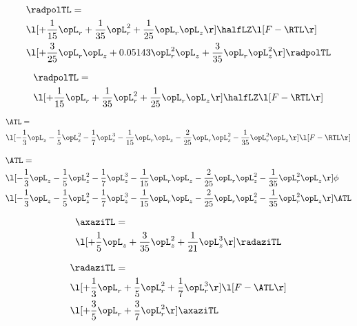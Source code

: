 \begin{alignat}{2} 
\label{eq:linradpolTL_2} 
& \radpolTL = \\ 
& \l[ + \frac{1}{15} \opL_r + \frac{1}{35} \opL_r^{2} + \frac{1}{25} \opL_r \opL_z  \r] \halfLZ \l[ F - \RTL \r] \nonumber \\ 
& \l[ + \frac{3}{25} \opL_r \opL_z +  0.05143 \opL_r^{2} \opL_z + \frac{3}{35} \opL_r \opL_z^{2}  \r] \radpolTL \nonumber \\ 
\end{alignat} 


\begin{alignat}{2} 
\label{eq:linradpolTL_3} 
& \radpolTL = \\ 
& \l[ + \frac{1}{15} \opL_r + \frac{1}{35} \opL_r^{2} + \frac{1}{25} \opL_r \opL_z  \r] \halfLZ \l[ F - \RTL \r] \nonumber \\ 
\end{alignat} 


\begin{alignat}{2} 
\label{eq:isoATL_1} 
& \ATL = \\ 
& \l[ - \frac{1}{3} \opL_z - \frac{1}{5} \opL_z^{2} - \frac{1}{7} \opL_z^{3} - \frac{1}{15} \opL_r \opL_z - \frac{2}{25} \opL_r \opL_z^{2} - \frac{1}{35} \opL_r^{2} \opL_z  \r] \l[ F - \RTL \r] \nonumber \\ 
\end{alignat} 


\begin{alignat}{2} 
\label{eq:isoATL_2} 
& \ATL = \\ 
& \l[ - \frac{1}{3} \opL_z - \frac{1}{5} \opL_z^{2} - \frac{1}{7} \opL_z^{3} - \frac{1}{15} \opL_r \opL_z - \frac{2}{25} \opL_r \opL_z^{2} - \frac{1}{35} \opL_r^{2} \opL_z  \r] \phi \nonumber \\ 
& \l[ - \frac{1}{3} \opL_z - \frac{1}{5} \opL_z^{2} - \frac{1}{7} \opL_z^{3} - \frac{1}{15} \opL_r \opL_z - \frac{2}{25} \opL_r \opL_z^{2} - \frac{1}{35} \opL_r^{2} \opL_z  \r] \ATL \nonumber \\ 
\end{alignat} 


\begin{alignat}{2} 
\label{eq:linaxaziTL_0} 
& \axaziTL = \\ 
& \l[ + \frac{1}{5} \opL_z + \frac{3}{35} \opL_z^{2} + \frac{1}{21} \opL_z^{3}  \r] \radaziTL \nonumber \\ 
\end{alignat} 


\begin{alignat}{2} 
\label{eq:linradaziTL_0} 
& \radaziTL = \\ 
& \l[ + \frac{1}{3} \opL_r + \frac{1}{5} \opL_r^{2} + \frac{1}{7} \opL_r^{3}  \r] \l[ F - \ATL \r] \nonumber \\ 
& \l[ + \frac{3}{5} \opL_r + \frac{3}{7} \opL_r^{2}  \r] \axaziTL \nonumber \\ 
\end{alignat} 


